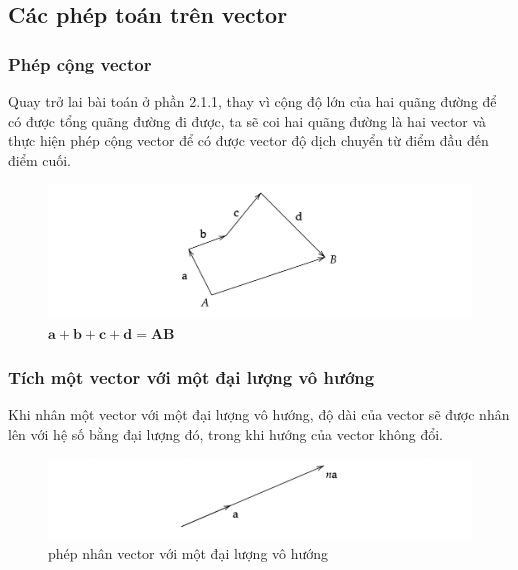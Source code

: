 \subsection{Các phép toán trên vector}

\subsubsection{Phép cộng vector}
Quay trở lai bài toán ở phần 2.1.1, thay vì cộng độ lớn của hai quãng đường để có được tổng quãng đường đi được, ta sẽ coi hai quãng đường là hai vector và thực hiện phép cộng vector để có được vector độ dịch chuyển từ điểm đầu đến điểm cuối.
\begin{figure}[H]
    \centering
    \includegraphics[width=1\textwidth]{Tuan2/Figures/congvector.png}
    \caption{$\mathbf{a}+\mathbf{b}+\mathbf{c}+\mathbf{d}=\mathbf{AB}$}
\end{figure}

\subsubsection{Tích một vector với một đại lượng vô hướng}
Khi nhân một vector với một đại lượng vô hướng, độ dài của vector sẽ được nhân lên với hệ số bằng đại lượng đó, trong khi hướng của vector không đổi.
\begin{figure}[H]
    \centering
    \includegraphics[width=1\textwidth]{Tuan2/Figures/vector x vo huong.png}
    \caption{phép nhân vector với một đại lượng vô hướng}
\end{figure}

